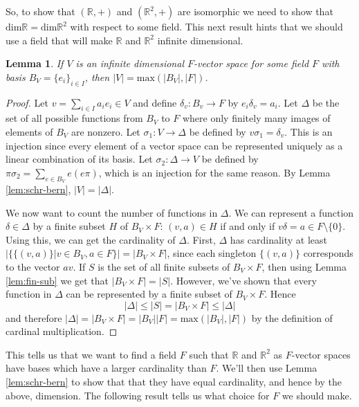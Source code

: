 \documentclass[12pt]{article}
\newtheorem{lemma}{Lemma}
\begin{document}
  So, to show that $(\mathbb{R},+)$ and $(\mathbb{R}^2,+)$ are
  isomorphic we need to show that
  $\text{dim}\mathbb{R}=\text{dim}\mathbb{R}^2$ with respect to some
  field. This next result hints that we should use a field that will
  make $\mathbb{R}$ and $\mathbb{R}^2$ infinite dimensional.

  \begin{lemma}
    \label{lem:dim-inf-dim}
    If $V$ is an infinite dimensional $F$-vector space for some field $F$
    with basis $B_V=\{e_i\}_{i \in I}$, then $|V|=\text{max}(|B_V|,|F|)$.
  \end{lemma}
  \begin{proof}
    Let $v=\sum_{i\in I}a_ie_i\in V$ and define $\delta_v:B_v\to F$ by
    $e_i\delta_v=a_i$. Let $\Delta$ be the set of all possible
    functions from $B_V$ to $F$ where only finitely many images of
    elements of $B_V$ are nonzero. Let $\sigma_1:V\to \Delta$ be
    defined by $v\sigma_1=\delta_v$. This is an injection since every
    element of a vector space can be represented uniquely as a linear
    combination of its basis. Let $\sigma_2:\Delta\to V$ be defined by
    $\pi\sigma_2=\sum_{e\in B_V}e(e\pi)$, which is an injection for
    the same reason. By Lemma \ref{lem:schr-bern}, $|V|=|\Delta|$.

    We now want to count the number of functions in $\Delta$. We can
    represent a function $\delta\in\Delta$ by a finite subset $H$ of
    $B_V\times F$: $(v,a)\in H$ if and only if
    $v\delta =a \in F\setminus \{0\}$. Using this, we can get the
    cardinality of $\Delta$. First, $\Delta$ has cardinality at least
    $|\{\{(v,a)\} | v\in B_V, a \in F\}|=|B_V\times F|$, since each
    singleton $\{(v,a)\}$ corresponds to the vector $av$. If $S$ is
    the set of all finite subsets of $B_V\times F$, then using
    Lemma \ref{lem:fin-sub} we get that $|B_V\times F| = |S|$. However,
    we've shown that every function in $\Delta$ can be represented by
    a finite subset of $B_V\times F$. Hence
    $$|\Delta| \leq |S| = |B_V\times F| \leq |\Delta|$$ and
    therefore $|\Delta| = |B_V\times F|=|B_V||F|=\text{max}(|B_V|,|F|)$ by the definition of cardinal multiplication.

  \end{proof}

  This tells us that we want to find a field $F$ such that $\mathbb{R}$ and $\mathbb{R}^2$ as $F$-vector spaces have bases which have a larger cardinality than $F$. We'll then use Lemma \ref{lem:schr-bern} to show that that they have equal cardinality, and hence by the above, dimension. The following result tells us what choice for $F$ we should make.
\end{document}
